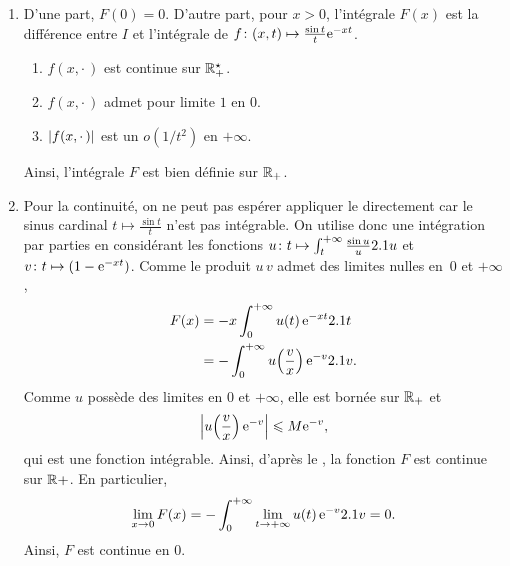 \begin{solution}
\begin{reponses}

\item 
\begin{enumerate}
\item D'une part, $F(0) = 0$. D'autre part, pour $x > 0$, l'intégrale $F(x)$ est la différence entre $I$ et l'intégrale de $\fonctionligne[f]{(x, t)}{\frac{\sin t}{t} \e^{- x t}}$.
\begin{enumerate}[label=(\roman*)]
\item $f(x, \cdot\,)$ est continue sur $\Rpe$.
\item $f(x, \cdot\,)$ admet pour limite $1$ en $0$.
\item $\abs{f(x, \cdot\,)}$ est un $o(1/t^2)$ en $+\infty$.
\end{enumerate}
Ainsi, l'intégrale $F$ est bien définie sur $\Rp$.

\item Pour la continuité, on ne peut pas espérer appliquer le  directement car le sinus cardinal $t \mapsto \frac{\sin t}{t}$ n'est pas intégrable. On utilise donc une intégration par parties en considérant les fonctions $\fonctionligne[u]{t}{\int_t^{+\infty} \frac{\sin u}{u} \d u}$ et $\fonctionligne[v]{t}{(1 - \e^{-x t})}$. Comme le produit $u\,v$ admet des limites nulles en~$0$ et $+\infty$, 
\begin{align*}
F(x) &= -x \int_{0}^{+\infty} u(t)\, \e^{- x t} \d t \\
&= -\int_0^{+\infty} u\mathopen{}\left(\frac{v}{x}\right) \e^{-v} \d v.
\end{align*}
Comme $u$ possède des limites en $0$ et $+\infty$, elle est bornée sur $\R_+$ et
\[
\abs{u\mathopen{}\left(\frac{v}{x}\right) \e^{-v}} \leqslant M \e^{-v},
\]
qui est une fonction intégrable. Ainsi, d'après le , la fonction $F$ est continue sur $\R+$. En particulier,
\[
\lim_{x\to0} F(x) = -\int_0^{+\infty} \lim_{t\to+\infty} u(t)\, \e^{-v} \d v = 0.
\]
Ainsi, $F$ est continue en $0$.


\end{enumerate}
\end{reponses}
\end{solution}
